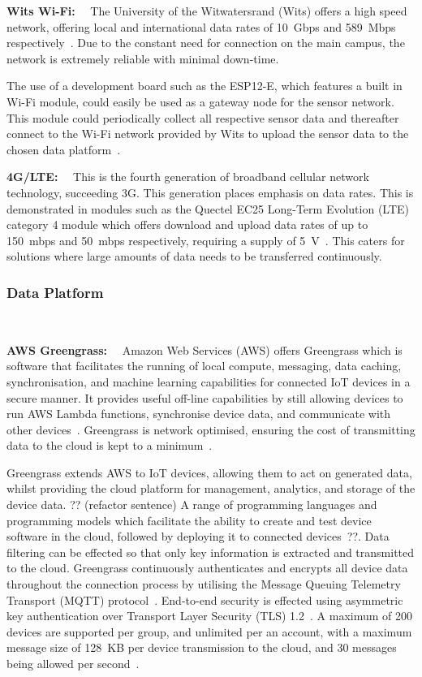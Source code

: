 \documentclass[10pt,twocolumn]{witseiepaper}
\begin{document}
				\textbf{Wits Wi-Fi:}~~
				The University of the Witwatersrand (Wits) offers a high speed network, offering local and international data rates of 10~Gbps and 589~Mbps respectively~\cite{wits-speed}. Due to the constant need for connection on the main campus, the network is extremely reliable with minimal down-time.
				
				The use of a development board such as the ESP12-E, which features a built in Wi-Fi module, could easily be used as a gateway node for the sensor network. This module could periodically collect all respective sensor data and thereafter connect to the Wi-Fi network provided by Wits to upload the sensor data to the chosen data platform~\cite{esp12e}.
			
				\textbf{4G/LTE:}~~
				This is the fourth generation of broadband cellular network technology, succeeding 3G. This generation places emphasis on data rates. This is demonstrated in modules such as the Quectel EC25 Long-Term Evolution (LTE) category 4 module which offers download and upload data rates of up to 150~mbps and 50~mbps respectively, requiring a supply of  5~V~\cite{ec25}. This caters for solutions where large amounts of data needs to be transferred continuously.

		\subsubsection{Data Platform} $   $
		
				\textbf{AWS Greengrass:}~~
				Amazon Web Services (AWS) offers Greengrass which is software that facilitates the running of local compute, messaging, data caching, synchronisation, and machine learning capabilities for connected IoT devices in a secure manner. It provides useful off-line capabilities by still allowing devices to run AWS Lambda functions, synchronise device data, and communicate with other devices~\cite{greengrass}. Greengrass is network optimised, ensuring the cost of transmitting data to the cloud is kept to a minimum~\cite{greengrass}.
				
				Greengrass extends AWS to IoT devices, allowing them to act on generated data, whilst providing the cloud platform for management, analytics, and storage of the device data. ?? (refactor sentence) A range of programming languages and programming models which facilitate the ability to create and test device software in the cloud, followed by deploying it to connected devices~\cite{greengrass}??. 
				Data filtering can be effected so that only key information is extracted and transmitted to the cloud. Greengrass continuously authenticates and encrypts all device data throughout the connection process by utilising the Message Queuing Telemetry Transport (MQTT) protocol~\cite{greengrass}. End-to-end security is effected using asymmetric key authentication over Transport Layer Security (TLS) 1.2~\cite{greengrass}. A maximum of 200 devices are supported per group, and unlimited per an account, with a maximum message size of 128~KB per device transmission to the cloud, and 30 messages being allowed per second~\cite{aws-quota}.
				
\end{document}
